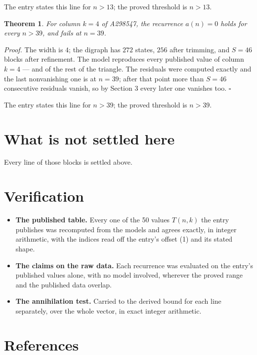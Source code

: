 \documentclass[11pt]{article}
\newtheorem{theorem}{Theorem}
\theoremstyle{definition}
\begin{document}
The entry states this line for $n > 13$; the proved threshold is $n > 13$.

\begin{theorem} For column $k = 4$ of A298547, the recurrence $a(n) = 0$ holds for every $n > 39$, and fails at $n = 39$.\end{theorem}

{\itshape Proof.} The width is $4$; the digraph has $272$ states, $256$ after trimming, and $S = 46$ blocks after refinement. The model reproduces every published value of column $k = 4$ --- and of the rest of the triangle. The residuals were computed exactly and the last nonvanishing one is at $n = 39$; after that point more than $S = 46$ consecutive residuals vanish, so by Section 3 every later one vanishes too. $\square$

The entry states this line for $n > 39$; the proved threshold is $n > 39$.

\section{What is not settled here}

Every line of those blocks is settled above.

\section{Verification}

\begin{itemize}

\item {\bfseries The published table.} Every one of the 50 values $T(n,k)$ the entry publishes was recomputed from the models and agrees exactly, in integer arithmetic, with the indices read off the entry's offset (1) and its stated shape.

\item {\bfseries The claims on the raw data.} Each recurrence was evaluated on the entry's published values alone, with no model involved, wherever the proved range and the published data overlap.

\item {\bfseries The annihilation test.} Carried to the derived bound for each line separately, over the whole vector, in exact integer arithmetic.

\end{itemize}

\section{References}
\end{document}
